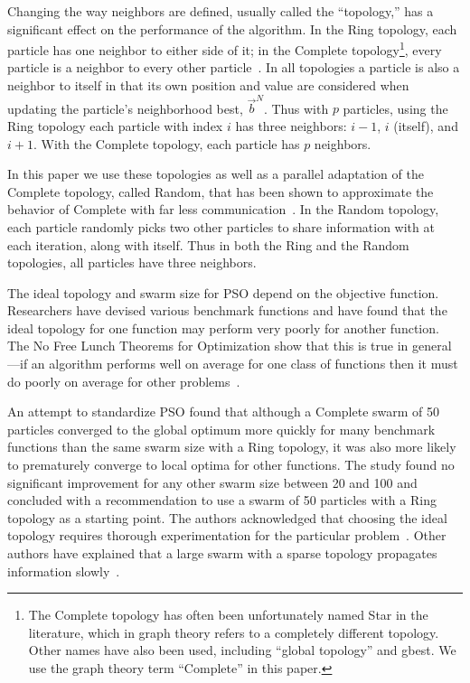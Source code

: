 \documentclass[smallcondensed]{svjour3}
\providecommand{\neigh}{\ensuremath{N}}
\providecommand{\nbest}{\ensuremath{\Vec{b}^\neigh}}
\begin{document}
Changing the way neighbors are defined, usually called the ``topology,'' has a
significant effect on the performance of the algorithm.  In the Ring topology,
each particle has one neighbor to either side of it; in the Complete
topology\footnote{The Complete topology has often been unfortunately named Star
in the literature, which in graph theory refers to a completely different
topology.  Other names have also been used, including ``global topology'' and
gbest.  We use the graph theory term ``Complete'' in this paper.}, every
particle is a neighbor to every other
particle~\citep{bratton-2007-defining-a-standard-for-pso}.  In all topologies a
particle is also a neighbor to itself in that its own position and value are
considered when updating the particle's neighborhood best, $\nbest$.  Thus with
$p$ particles, using the Ring topology each particle with index $i$ has three
neighbors: $i-1$, $i$ (itself), and $i+1$.  With the Complete topology, each
particle has $p$ neighbors.

In this paper we use these topologies as well as a parallel adaptation of the
Complete topology, called Random, that has been shown to approximate the
behavior of Complete with far less
communication~\citep{mcnabb-2009-large-particle-swarms}.  In the Random
topology, each particle randomly picks two other particles to share information
with at each iteration, along with itself.  Thus in both the Ring and the
Random topologies, all particles have three neighbors.

The ideal topology and swarm size for PSO depend on the objective function.
Researchers have devised various benchmark functions and have found that the
ideal topology for one function may perform very poorly for another function.
The No Free Lunch Theorems for Optimization show that this is true in
general---if an algorithm performs well on average for one class of functions
then it must do poorly on average for other
problems~\citep{wolpert-1997-nfl-for-optimization}.

An attempt to standardize PSO found that although a Complete swarm of 50
particles converged to the global optimum more quickly for many benchmark
functions than the same swarm size with a Ring topology, it was also more
likely to prematurely converge to local optima for other functions.  The study
found no significant improvement for any other swarm size between 20 and 100
and concluded with a recommendation to use a swarm of 50 particles with a Ring
topology as a starting point.  The authors acknowledged that choosing the ideal
topology requires thorough experimentation for the particular
problem~\citep{bratton-2007-defining-a-standard-for-pso}.  Other authors have
explained that a large swarm with a sparse topology propagates information
slowly~\citep{montes-de-oca-2009-frankensteins-pso}.
\end{document}
